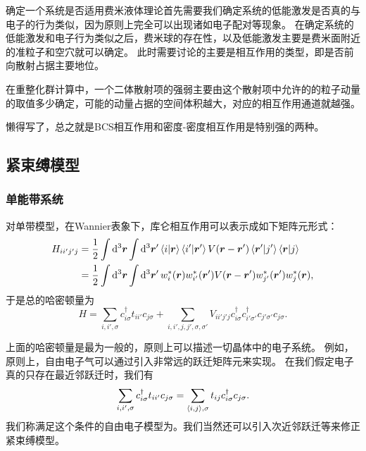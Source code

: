 确定一个系统是否适用费米液体理论首先需要我们确定系统的低能激发是否真的与电子的行为类似，因为原则上完全可以出现诸如电子配对等现象。
在确定系统的低能激发和电子行为类似之后，费米球的存在性，以及低能激发主要是费米面附近的准粒子和空穴就可以确定。
此时需要讨论的主要是相互作用的类型，即是否前向散射占据主要地位。

在重整化群计算中，一个二体散射项的强弱主要由这个散射项中允许的的粒子动量的取值多少确定，可能的动量占据的空间体积越大，对应的相互作用通道就越强。

懒得写了，总之就是BCS相互作用和密度-密度相互作用是特别强的两种。


\subsection{紧束缚模型}

\subsubsection{单能带系统}

对单带模型，在Wannier表象下，库仑相互作用可以表示成如下矩阵元形式：
\begin{equation}
    \begin{aligned}
        H_{i i' j' j} &= \frac{1}{2} \int \dd[3]{\vb*{r}} \int \dd[3]{\vb*{r}'} \braket{i}{\vb*{r}} \braket{i'}{\vb*{r}'} V(\vb*{r} - \vb*{r}') \braket{\vb*{r}'}{j'} \braket{\vb*{r}}{j} \\
        &= \frac{1}{2} \int \dd[3]{\vb*{r}} \int \dd[3]{\vb*{r}'} w_i^*(\vb*{r}) w_{i'}^*(\vb*{r}') V(\vb*{r} - \vb*{r}') w_{j'}^*(\vb*{r}') w_j^*(\vb*{r}),
    \end{aligned}
    \label{eq:wannier-basis-interaction}
\end{equation}
于是总的哈密顿量为
\begin{equation}
    H = \sum_{i, i', \sigma} c^\dagger_{i \sigma} t_{i i'} c_{j \sigma} + \sum_{i, i', j, j', \sigma, \sigma'} V_{i i' j' j} c^\dagger_{i \sigma} c^\dagger_{i' \sigma'} c_{j' \sigma'} c_{j \sigma}.
\end{equation}

上面的哈密顿量是最为一般的，原则上可以描述一切晶体中的电子系统。
例如，原则上，自由电子气可以通过引入非常远的跃迁矩阵元来实现。
在我们假定电子真的只存在最近邻跃迁时，我们有
\begin{equation}
    \sum_{i, i', \sigma} c^\dagger_{i \sigma} t_{i i'} c_{j \sigma} = \sum_{\langle i, j \rangle, \sigma} t_{ij} c^\dagger_{i \sigma} c_{j \sigma}.
\end{equation}
我们称满足这个条件的自由电子模型为。我们当然还可以引入次近邻跃迁等来修正紧束缚模型。

